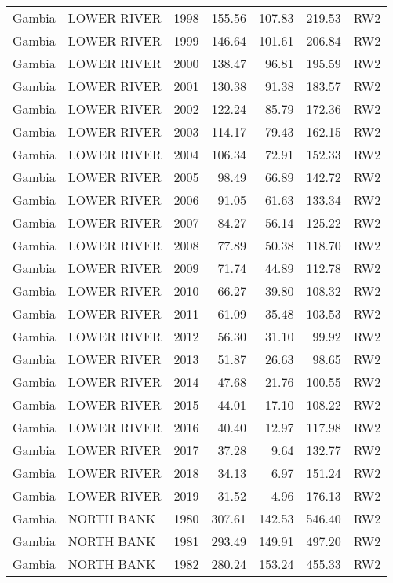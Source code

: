 \begin{longtable}{lllrrrl}
  Gambia & LOWER RIVER & 1998 & 155.56 & 107.83 & 219.53 & RW2 \\ 
  Gambia & LOWER RIVER & 1999 & 146.64 & 101.61 & 206.84 & RW2 \\ 
  Gambia & LOWER RIVER & 2000 & 138.47 & 96.81 & 195.59 & RW2 \\ 
  Gambia & LOWER RIVER & 2001 & 130.38 & 91.38 & 183.57 & RW2 \\ 
  Gambia & LOWER RIVER & 2002 & 122.24 & 85.79 & 172.36 & RW2 \\ 
  Gambia & LOWER RIVER & 2003 & 114.17 & 79.43 & 162.15 & RW2 \\ 
  Gambia & LOWER RIVER & 2004 & 106.34 & 72.91 & 152.33 & RW2 \\ 
  Gambia & LOWER RIVER & 2005 & 98.49 & 66.89 & 142.72 & RW2 \\ 
  Gambia & LOWER RIVER & 2006 & 91.05 & 61.63 & 133.34 & RW2 \\ 
  Gambia & LOWER RIVER & 2007 & 84.27 & 56.14 & 125.22 & RW2 \\ 
  Gambia & LOWER RIVER & 2008 & 77.89 & 50.38 & 118.70 & RW2 \\ 
  Gambia & LOWER RIVER & 2009 & 71.74 & 44.89 & 112.78 & RW2 \\ 
  Gambia & LOWER RIVER & 2010 & 66.27 & 39.80 & 108.32 & RW2 \\ 
  Gambia & LOWER RIVER & 2011 & 61.09 & 35.48 & 103.53 & RW2 \\ 
  Gambia & LOWER RIVER & 2012 & 56.30 & 31.10 & 99.92 & RW2 \\ 
  Gambia & LOWER RIVER & 2013 & 51.87 & 26.63 & 98.65 & RW2 \\ 
  Gambia & LOWER RIVER & 2014 & 47.68 & 21.76 & 100.55 & RW2 \\ 
  Gambia & LOWER RIVER & 2015 & 44.01 & 17.10 & 108.22 & RW2 \\ 
  Gambia & LOWER RIVER & 2016 & 40.40 & 12.97 & 117.98 & RW2 \\ 
  Gambia & LOWER RIVER & 2017 & 37.28 & 9.64 & 132.77 & RW2 \\ 
  Gambia & LOWER RIVER & 2018 & 34.13 & 6.97 & 151.24 & RW2 \\ 
  Gambia & LOWER RIVER & 2019 & 31.52 & 4.96 & 176.13 & RW2 \\ 
  Gambia & NORTH BANK & 1980 & 307.61 & 142.53 & 546.40 & RW2 \\ 
  Gambia & NORTH BANK & 1981 & 293.49 & 149.91 & 497.20 & RW2 \\ 
  Gambia & NORTH BANK & 1982 & 280.24 & 153.24 & 455.33 & RW2 \\ 

\end{longtable}
